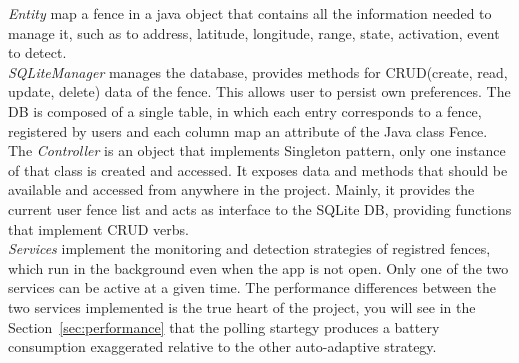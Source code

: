\documentclass[conference]{IEEEtran}
\begin{document}
\textit{Entity} map a fence in a java object that contains all the information needed to manage it, such as to address, latitude, longitude, range, state, activation, event to detect.\\
\textit{SQLiteManager} manages the database, provides methods for CRUD(create, read, update, delete) data of the fence.
This allows user to persist own preferences.
The DB is composed of a single table, in which each entry corresponds to a fence, registered by users and each column map an attribute of the Java class Fence.\\
The \textit{Controller} is an object that implements Singleton pattern, only one instance of that class is created and accessed.
It exposes data and methods that should be available and accessed from anywhere in the project.
Mainly, it provides the current user fence list and acts as interface to the SQLite DB, providing functions that implement CRUD verbs.\\
\textit{Services} implement the monitoring and detection strategies of registred fences, which run in the background even when the app is not open.
Only one of the two services can be active at a given time.
The performance differences between the two services implemented is the true heart of the project, you will see in the Section~\ref{sec:performance}
that the polling startegy produces a battery consumption exaggerated relative to the other auto-adaptive strategy.
\end{document}
